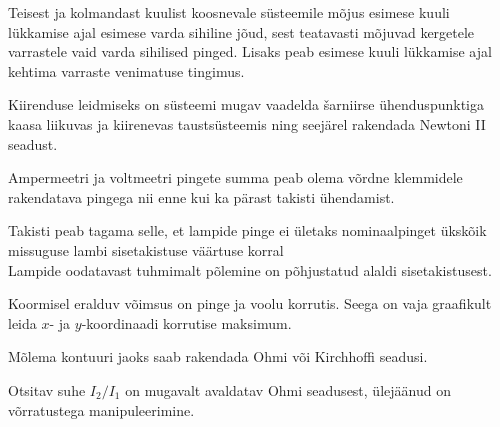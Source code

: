 \documentclass[10pt, twoside]{article}
\begin{document}
{
\hint
Teisest ja kolmandast kuulist koosnevale süsteemile mõjus esimese kuuli lükkamise ajal esimese varda sihiline jõud, sest teatavasti mõjuvad kergetele varrastele vaid varda sihilised pinged. Lisaks peab esimese kuuli lükkamise ajal kehtima varraste venimatuse tingimus.

Kiirenduse leidmiseks on süsteemi mugav vaadelda šarniirse ühenduspunktiga kaasa liikuvas ja kiirenevas taustsüsteemis ning seejärel rakendada Newtoni II seadust.
\probend
\bigskip


\hint
Ampermeetri ja voltmeetri pingete summa peab olema võrdne klemmidele rakendatava pingega nii enne kui ka pärast takisti ühendamist.
\probend
\bigskip


\hint
\osa Takisti peab tagama selle, et lampide pinge ei ületaks nominaalpinget ükskõik missuguse lambi sisetakistuse väärtuse korral\\
\osa Lampide oodatavast tuhmimalt põlemine on põhjustatud alaldi sisetakistusest.
\probend
\bigskip


\hint
Koormisel eralduv võimsus on pinge ja voolu korrutis. Seega on vaja graafikult leida $x$- ja $y$-koordinaadi korrutise maksimum.
\probend
\bigskip


\hint
Mõlema kontuuri jaoks saab rakendada Ohmi või Kirchhoffi
seadusi.
\probend
\bigskip


\hint
Otsitav suhe $I_2/I_1$ on mugavalt avaldatav Ohmi seadusest, ülejäänud on võrratustega manipuleerimine.
\probend
\bigskip


}
\end{document}
